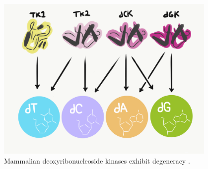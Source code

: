 \begin{figure}
 \begin{columns}
 \begin{column}{0.6\textwidth}
 \includegraphics[width=\textwidth]{img/intraindividual_degeneracy}
 \end{column}
 \begin{column}{0.4\textwidth}
\captionsetup{singlelinecheck=off,justification=raggedright}
  	\caption{Mammalian deoxyribonucleoside kinases exhibit degeneracy \cite{Sandrini2005DeoxyribonucleosideReaction.}.}
    \label{fig:intraindividual_degeneracy}
    
\end{column}
\end{columns}
\end{figure}